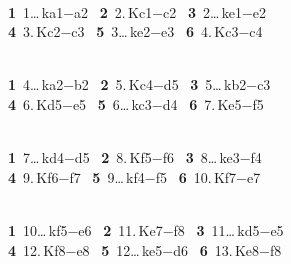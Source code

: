 \documentclass[11pt]{article}
\begin{document}
\begin{minipage}{0.47\textwidth}\centering
  \\[1.2mm]
  {\scriptsize\color{inksoft}\textbf{1}~1\ldots\,ka1$-$a2 \ \textbf{2}~2.\,Kc1$-$c2 \ \textbf{3}~2\ldots\,ke1$-$e2\\\textbf{4}~3.\,Kc2$-$c3 \ \textbf{5}~3\ldots\,ke2$-$e3 \ \textbf{6}~4.\,Kc3$-$c4}
\end{minipage}\hfill
\begin{minipage}{0.47\textwidth}\centering
  \\[1.2mm]
  {\scriptsize\color{inksoft}\textbf{1}~4\ldots\,ka2$-$b2 \ \textbf{2}~5.\,Kc4$-$d5 \ \textbf{3}~5\ldots\,kb2$-$c3\\\textbf{4}~6.\,Kd5$-$e5 \ \textbf{5}~6\ldots\,kc3$-$d4 \ \textbf{6}~7.\,Ke5$-$f5}
\end{minipage}

\smallskip

\begin{minipage}{0.47\textwidth}\centering
  \\[1.2mm]
  {\scriptsize\color{inksoft}\textbf{1}~7\ldots\,kd4$-$d5 \ \textbf{2}~8.\,Kf5$-$f6 \ \textbf{3}~8\ldots\,ke3$-$f4\\\textbf{4}~9.\,Kf6$-$f7 \ \textbf{5}~9\ldots\,kf4$-$f5 \ \textbf{6}~10.\,Kf7$-$e7}
\end{minipage}\hfill
\begin{minipage}{0.47\textwidth}\centering
  \\[1.2mm]
  {\scriptsize\color{inksoft}\textbf{1}~10\ldots\,kf5$-$e6 \ \textbf{2}~11.\,Ke7$-$f8 \ \textbf{3}~11\ldots\,kd5$-$e5\\\textbf{4}~12.\,Kf8$-$e8 \ \textbf{5}~12\ldots\,ke5$-$d6 \ \textbf{6}~13.\,Ke8$-$f8}
\end{minipage}
\end{document}
